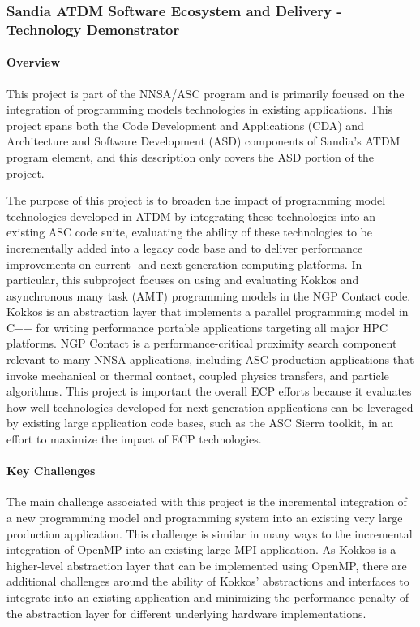 \subsubsection{Sandia ATDM Software Ecosystem and Delivery -
  Technology Demonstrator} 

\paragraph{Overview} 

This project is part of the NNSA/ASC program and is primarily focused
on the integration of programming models technologies in existing
applications. This project spans both the Code Development and
Applications (CDA) and Architecture and Software Development (ASD)
components of Sandia's ATDM program element, and this description only
covers the ASD portion of the project.

The purpose of this project is to broaden the impact of
programming model technologies developed in ATDM by integrating these
technologies into an existing ASC code suite, evaluating the ability
of these technologies to be incrementally added into a legacy code
base and to deliver performance improvements on current- and
next-generation computing platforms. In particular, this subproject
focuses on using and evaluating Kokkos and asynchronous many task
(AMT) programming models in the NGP Contact code. Kokkos is an
abstraction layer that implements a parallel programming model in C++
for writing performance portable applications targeting all major HPC
platforms. NGP Contact is a performance-critical proximity search
component relevant to many NNSA applications, including ASC production
applications that invoke mechanical or thermal contact, coupled
physics transfers, and particle algorithms. This project is important
the overall ECP efforts because it evaluates how well technologies
developed for next-generation applications can be leveraged by
existing large application code bases, such as the ASC Sierra toolkit,
in an effort to maximize the impact of ECP technologies. 

\paragraph{Key  Challenges}

The main challenge associated with this project is the incremental
integration of a new programming model and programming system into an
existing very large production application. This challenge is similar
in many ways to the incremental integration of OpenMP into an existing
large MPI application. As Kokkos is a higher-level abstraction layer
that can be implemented using OpenMP, there are additional challenges
around the ability of Kokkos' abstractions and interfaces to integrate
into an existing application and minimizing the performance penalty of
the abstraction layer for different underlying hardware
implementations.

